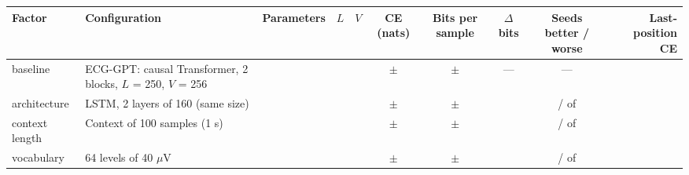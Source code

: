\begin{tabular}{llrrrccccr}
\toprule
Factor & Configuration & Parameters & $L$ & $V$ & CE (nats) & Bits per sample & $\Delta$ bits & Seeds better / worse & Last-position CE \\
\midrule
baseline & ECG-GPT: causal Transformer, 2 blocks, $L$ = 250, $V$ = 256 & \generativeParamsBase{} & \generativeContextBase{} & \generativeVocabBase{} & \generativeCeMeanBase{} $\pm$ \generativeCeSdBase{} & \generativeBitsMeanBase{} $\pm$ \generativeBitsSdBase{} & --- & --- & \generativeCeLastMeanBase{} \\
\addlinespace
architecture & LSTM, 2 layers of 160 (same size) & \generativeParamsLstm{} & \generativeContextLstm{} & \generativeVocabLstm{} & \generativeCeMeanLstm{} $\pm$ \generativeCeSdLstm{} & \generativeBitsMeanLstm{} $\pm$ \generativeBitsSdLstm{} & \generativeDiffMeanLstm{} & \generativeNSeedsBetterLstm{} / \generativeNSeedsWorseLstm{} of \generativeNSeedsComparedLstm{} & \generativeCeLastMeanLstm{} \\
\addlinespace
context length & Context of 100 samples (1 s) & \generativeParamsCtxOneZeroZero{} & \generativeContextCtxOneZeroZero{} & \generativeVocabCtxOneZeroZero{} & \generativeCeMeanCtxOneZeroZero{} $\pm$ \generativeCeSdCtxOneZeroZero{} & \generativeBitsMeanCtxOneZeroZero{} $\pm$ \generativeBitsSdCtxOneZeroZero{} & \generativeDiffMeanCtxOneZeroZero{} & \generativeNSeedsBetterCtxOneZeroZero{} / \generativeNSeedsWorseCtxOneZeroZero{} of \generativeNSeedsComparedCtxOneZeroZero{} & \generativeCeLastMeanCtxOneZeroZero{} \\
\addlinespace
vocabulary & 64 levels of 40 $\mu$V & \generativeParamsVocabSixFour{} & \generativeContextVocabSixFour{} & \generativeVocabVocabSixFour{} & \generativeCeMeanVocabSixFour{} $\pm$ \generativeCeSdVocabSixFour{} & \generativeBitsMeanVocabSixFour{} $\pm$ \generativeBitsSdVocabSixFour{} & \generativeDiffMeanVocabSixFour{} & \generativeNSeedsBetterVocabSixFour{} / \generativeNSeedsWorseVocabSixFour{} of \generativeNSeedsComparedVocabSixFour{} & \generativeCeLastMeanVocabSixFour{} \\

\end{tabular}
